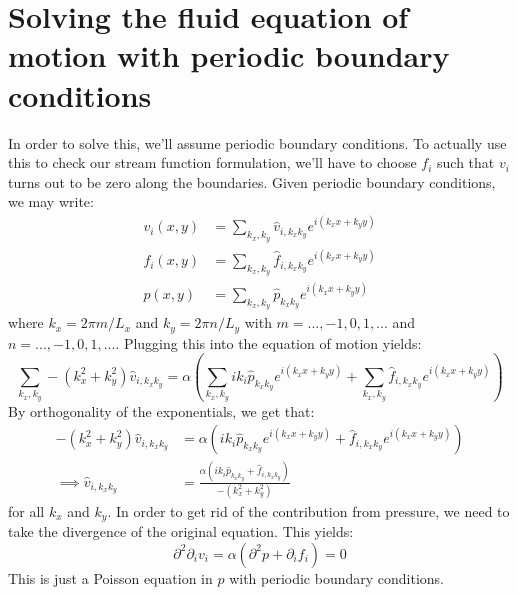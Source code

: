 \documentclass[reqno]{article}
\begin{document}
	\section{Solving the fluid equation of motion with periodic boundary conditions}
	In order to solve this, we'll assume periodic boundary conditions. 
	To actually use this to check our stream function formulation, we'll have to choose $f_i$ such that $v_i$ turns out to be zero along the boundaries. 
	Given periodic boundary conditions, we may write:
	\begin{align}
	v_i (x, y) &= \sum_{k_x, k_y} \hat{v}_{i, k_x k_y} 
	e^{ i \left( k_x x + k_y y \right) } \\
	f_i (x, y) &= \sum_{k_x, k_y} \hat{f}_{i, k_x k_y}
	e^{ i \left( k_x x + k_y y \right) } \\
	p (x, y) &= \sum_{k_x, k_y} \hat{p}_{k_x k_y}
	e^{ i \left( k_x x + k_y y \right) }
	\end{align}
	where $k_x = 2\pi m/L_x$ and $k_y = 2\pi n/L_y$ with $m = ..., -1, 0, 1, ...$ and $n = ..., -1, 0, 1, ...$.
	Plugging this into the equation of motion yields:
	\begin{equation}
	\sum_{k_x, k_y} - \left( k_x^2 + k_y^2 \right) \hat{v}_{i, k_x k_y} =
	\alpha \left( 
	\sum_{k_x, k_y} i k_i \hat{p}_{k_x k_y}
	e^{ i \left( k_x x + k_y y \right) }
	+ \sum_{k_x, k_y} \hat{f}_{i, k_x k_y}
	e^{ i \left( k_x x + k_y y \right) }
	\right)
	\end{equation}
	By orthogonality of the exponentials, we get that:
	\begin{equation}
	\begin{split}
	- \left( k_x^2 + k_y^2 \right) \hat{v}_{i, k_x k_y} 
	&= \alpha \left( 
	i k_i \hat{p}_{k_x k_y}
	e^{ i \left( k_x x + k_y y \right) }
	+ \hat{f}_{i, k_x k_y}
	e^{ i \left( k_x x + k_y y \right) }
	\right) \\
	\implies
	\hat{v}_{i, k_x k_y}
	&= \frac{ \alpha \left(
		i k_i \hat{p}_{k_x k_y}
		+ \hat{f}_{i, k_x k_y} 
		\right) }
	{ - \left( k_x^2 + k_y^2 \right) }
	\end{split}
	\end{equation}
	for all $k_x$ and $k_y$. 
	In order to get rid of the contribution from pressure, we need to take the divergence of the original equation.
	This yields:
	\begin{equation}
	\partial^2 \partial_i v_i
	= \alpha \left(
	\partial^2 p + \partial_i f_i
	\right)
	= 0
	\end{equation}
	This is just a Poisson equation in $p$ with periodic boundary conditions.
\end{document}
